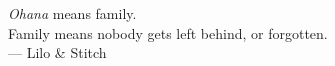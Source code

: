 
\thispagestyle{empty}


\vspace*{3cm}

\begin{center}
\emph{Ohana} means family. \\
Family means nobody gets left behind, or forgotten. \\ \medskip
--- Lilo \& Stitch    
\end{center}

\medskip


